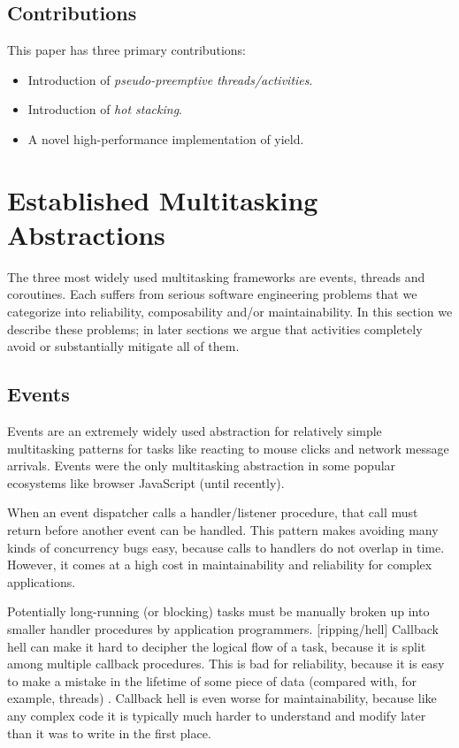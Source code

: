 \documentclass[10pt,preprint]{sigplanconf}
\begin{document}

\subsection{Contributions}

This paper has three primary contributions:

\begin{itemize}
\item Introduction of \emph{pseudo-preemptive threads/activities}.
\item Introduction of \emph{hot stacking}.
\item A novel high-performance implementation of yield.
\end{itemize}

\section{Established Multitasking Abstractions}

The three most widely used multitasking frameworks are events, threads and coroutines.
Each suffers from serious software engineering problems that we categorize into reliability, composability and/or maintainability.
In this section we describe these problems; in later sections we argue that activities completely avoid or substantially mitigate all of them.

\subsection{Events}

Events are an extremely widely used abstraction for relatively simple multitasking patterns for tasks like reacting to mouse clicks and network message arrivals.
Events were the only multitasking abstraction in some popular ecosystems like browser JavaScript (until recently).

When an event dispatcher calls a handler/listener procedure, that call must return before another event can be handled.
This pattern makes avoiding many kinds of concurrency bugs easy, because calls to handlers do not overlap in time.
However, it comes at a high cost in maintainability and reliability for complex applications.

Potentially long-running (or blocking) tasks must be manually broken up into smaller handler procedures by application programmers.
[ripping/hell]
Callback hell can make it hard to decipher the logical flow of a task, because it is split among  multiple callback procedures.
This is bad for reliability, because it is easy to make a mistake in the lifetime of some piece of data (compared with, for example, threads) \cite{Behren2003a}.
Callback hell is even worse for maintainability, because like any complex code it is typically much harder to understand and modify later than it was to write in the first place.
\end{document}
